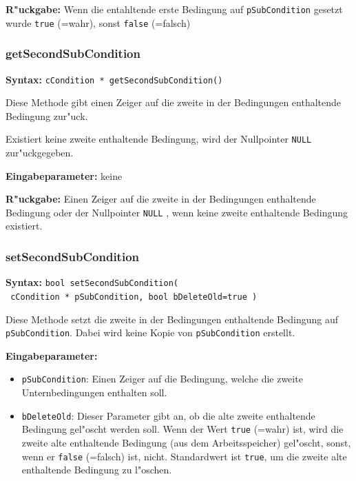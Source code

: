 \bigskip\noindent
\textbf{R"uckgabe:} Wenn die entahltende erste Bedingung auf \verb|pSubCondition| gesetzt wurde \verb|true| (=wahr), sonst \verb|false| (=falsch)


\subsubsection{getSecondSubCondition}

\textbf{Syntax:} \verb|cCondition * getSecondSubCondition()|

\bigskip\noindent
Diese Methode gibt einen Zeiger auf die zweite in der Bedingungen enthaltende Bedingung zur"uck.

Existiert keine zweite enthaltende Bedingung, wird der Nullpointer \verb|NULL| zur"uckgegeben.

\bigskip\noindent
\textbf{Eingabeparameter:} keine

\bigskip\noindent
\textbf{R"uckgabe:} Einen Zeiger auf die zweite in der Bedingungen enthaltende Bedingung oder der Nullpointer \verb|NULL| , wenn keine zweite enthaltende Bedingung existiert.


\subsubsection{setSecondSubCondition}

\textbf{Syntax:} \verb|bool setSecondSubCondition(| \\\verb| cCondition * pSubCondition, bool bDeleteOld=true )|

\bigskip\noindent
Diese Methode setzt die zweite in der Bedingungen enthaltende Bedingung auf \verb|pSubCondition|. Dabei wird keine Kopie von \verb|pSubCondition| erstellt.

\bigskip\noindent
\textbf{Eingabeparameter:}
\begin{itemize}
 \item \verb|pSubCondition|: Einen Zeiger auf die Bedingung, welche die zweite Unternbedingungen enthalten soll.
 \item \verb|bDeleteOld|: Dieser Parameter gibt an, ob die alte zweite enthaltende Bedingung gel"oscht werden soll. Wenn der Wert \verb|true| (=wahr) ist, wird die zweite alte enthaltende Bedingung (aus dem Arbeitsspeicher) gel"oscht, sonst, wenn er \verb|false| (=falsch) ist, nicht. Standardwert ist \verb|true|, um die zweite alte enthaltende Bedingung zu l"oschen.
\end{itemize}

